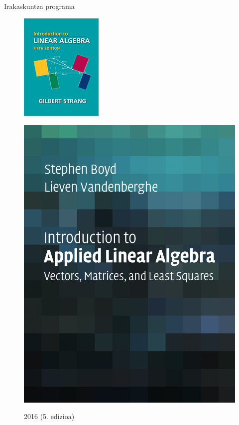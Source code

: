 \documentclass[
 10pt,%
 compress,%
 t,       %
 xcolor=svgnames
]{beamer}
\theoremstyle{definition} \newtheorem{definicion}{Definicion}[section]
\theoremstyle{propiedades} \newtheorem{propiedades}{Propiedades}[section]
\begin{document}
\begin{frame}{Irakaskuntza programa}
\begin{figure}
	\begin{minipage}{0.3\textwidth}
		\colorbox{white}  {\includegraphics[width=0.8\linewidth]{linearalgebra5}}
		  \centering \caption{\centering \tiny 2016 (5. edizioa)}
	\end{minipage}
	\begin{minipage}{0.3\textwidth}
		\colorbox{white}  {\includegraphics[width=0.8\linewidth]{Intro_To_LA}}

\end{minipage}
\end{figure}
\end{frame}
\end{document}
